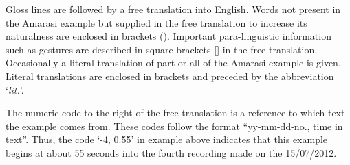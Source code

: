 \begin{exe}
	\label{ex:120715-4, 0.05 ch:Int}
	\label{130825-6, 10.05 ch:Int}
	\label{120923-1, 6.01}
	\label{130821-1, 6.20}
\end{exe}

Gloss lines are followed by a free translation into English.
Words not present in the Amarasi example
but supplied in the free translation to increase
its naturalness are enclosed in brackets ().
Important para-linguistic information such as gestures
are described in square brackets [] in the free translation.
Occasionally a literal translation of part or all of the Amarasi example is given.
Literal translations are enclosed in brackets and preceded by the abbreviation `\emph{lit.}'.

The numeric code to the right of the free translation
is a reference to which text the example comes from.
These codes follow the format ``yy-mm-dd-no., time in text''.
Thus, the code `{-4, 0.55}' in example  above
indicates that this example begins at about 55 seconds
into the fourth recording made on the 15/07/2012.

